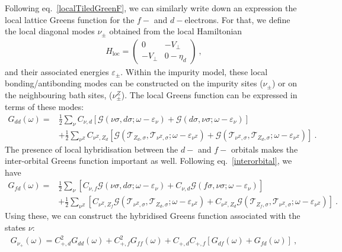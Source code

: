 Following eq.~\ref{localTiledGreenF}, we can similarly write down an expression the local lattice Greens function for the \(f-\) and \(d-\)electrons. For that, we define the local diagonal modes \(\nu_\pm\) obtained from the local Hamiltonian
\begin{equation}\begin{aligned}
	H_\text{loc} = \begin{pmatrix} 0  & -V_\perp\\ -V_\perp & 0 - \eta_d \end{pmatrix}~,
\end{aligned}\end{equation}
and their associated energies \(\varepsilon_\pm\). Within the impurity model, these local bonding/antibonding modes can be constructed on the impurity sites (\(\nu_\pm\)) or on the neighbouring bath sites, (\(\nu^Z_\pm\)). The local Greens function can be expressed in terms of these modes:
\begin{equation}\begin{aligned}
	G_{dd}(\omega) =& \frac{1}{2}\sum_{\nu}C_{\nu, d} \left[\mathcal{G}(\nu\sigma, d\sigma; \omega - \varepsilon_{\nu}) + \mathcal{G}(d\sigma, \nu\sigma; \omega - \varepsilon_{\nu})\right]\\
								  &+ \frac{1}{2}\sum_{\nu^Z}C_{\nu^Z, Z_d} \left[\mathcal{G}(\mathcal{T}_{Z_d, \sigma}, \mathcal{T}_{\nu^Z,\sigma}; \omega - \varepsilon_{\nu^Z}) + \mathcal{G}(\mathcal{T}_{\nu^Z,\sigma}, \mathcal{T}_{Z_d, \sigma}; \omega - \varepsilon_{\nu^Z})\right]~.
\end{aligned}\end{equation}
The presence of local hybridisation between the \(d-\) and \(f-\) orbitals makes the inter-orbital Greens function important as well. Following eq.~\ref{interorbital}, we have
\begin{equation}\begin{aligned}
	G_{fd}(\omega) =& \frac{1}{2}\sum_{\nu} \left[C_{\nu, f}\mathcal{G}(\nu\sigma, d\sigma; \omega - \varepsilon_{\nu}) + C_{\nu,d}\mathcal{G}(f\sigma, \nu\sigma; \omega - \varepsilon_{\nu})\right]\\
								  &+ \frac{1}{2}\sum_{\nu^Z}\left[C_{\nu^Z, Z_f}\mathcal{G}(\mathcal{T}_{\nu^Z,\sigma}, \mathcal{T}_{Z_d, \sigma}; \omega - \varepsilon_{\nu^Z}) + C_{\nu^Z, Z_d} \mathcal{G}(\mathcal{T}_{Z_f, \sigma}, \mathcal{T}_{\nu^Z,\sigma}; \omega - \varepsilon_{\nu^Z})\right]~.
\end{aligned}\end{equation}
Using these, we can construct the hybridised Greens function associated with the states \(\nu\):
\begin{equation}\begin{aligned}
	G_{\nu_+}(\omega) = C_{+,d}^2 G_{dd}(\omega) + C_{+,f}^2 G_{ff}(\omega) + C_{+,d}C_{+,f}\left[ G_{df}(\omega) + G_{fd}(\omega)\right]~,
\end{aligned}\end{equation}

